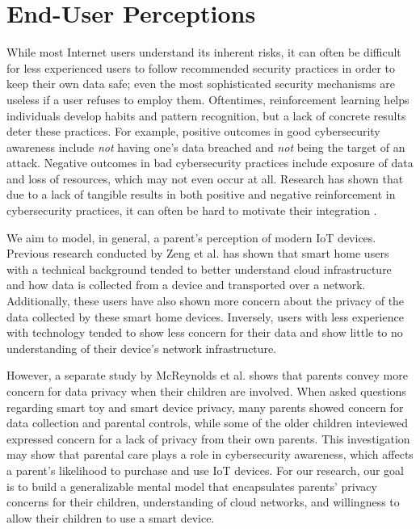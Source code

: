\documentclass[12pt]{ucthesis}
\begin{document}
\section{End-User Perceptions}
While most Internet users understand its inherent risks, it can often be difficult for less experienced users to follow recommended security practices in order to keep their own data safe; even the most sophisticated security mechanisms are useless if a user refuses to employ them. Oftentimes, reinforcement learning helps individuals develop habits and pattern recognition, but a lack of concrete results deter these practices. For example, positive outcomes in good cybersecurity awareness include \textit{not} having one's data breached and \textit{not} being the target of an attack. Negative outcomes in bad cybersecurity practices include exposure of data and loss of resources, which may not even occur at all. Research has shown that due to a lack of tangible results in both positive and negative reinforcement in cybersecurity practices, it can often be hard to motivate their integration \cite{west:psychology}.

We aim to model, in general, a parent's perception of modern IoT devices. Previous research conducted by Zeng et al. \cite{zeng:enduser} has shown that smart home users with a technical background tended to better understand cloud infrastructure and how data is collected from a device and transported over a network. Additionally, these users have also shown more concern about the privacy of the data collected by these smart home devices. Inversely, users with less experience with technology tended to show less concern for their data and show little to no understanding of their device's network infrastructure. 

However, a separate study by McReynolds et al. \cite{mcreynolds:toysthatlisten} shows that parents convey more concern for data privacy when their children are involved. When asked questions regarding smart toy and smart device privacy, many parents showed concern for data collection and parental controls, while some of the older children inteviewed expressed concern for a lack of privacy from their own parents. This investigation may show that parental care plays a role in cybersecurity awareness, which affects a parent's likelihood to purchase and use IoT devices. For our research, our goal is to build a generalizable mental model that encapsulates parents' privacy concerns for their children, understanding of cloud networks, and willingness to allow their children to use a smart device. 
\end{document}
